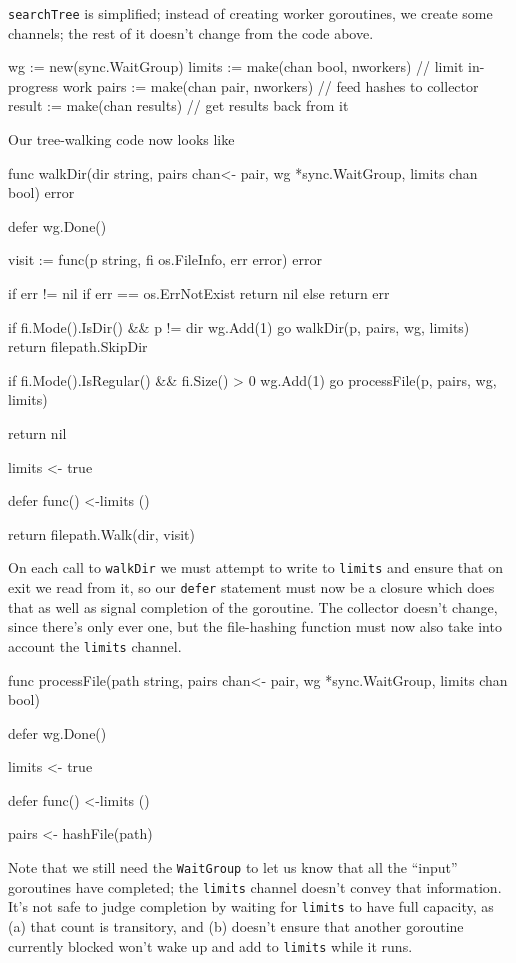 \documentclass[12pt,notitlepage]{article}
\begin{document}
\verb|searchTree| is simplified; instead of creating worker goroutines, we create
some channels; the rest of it doesn't change from the code above.
\begin{golang}
	wg := new(sync.WaitGroup)
	limits := make(chan bool, nworkers) // limit in-progress work
	pairs := make(chan pair, nworkers)  // feed hashes to collector
	result := make(chan results)        // get results back from it
\end{golang}
Our tree-walking code now looks like
\begin{golang}
func walkDir(dir string, pairs chan<- pair, wg *sync.WaitGroup,
             limits chan bool) error {
	defer wg.Done()

	visit := func(p string, fi os.FileInfo, err error) error {
		if err != nil {
			if err == os.ErrNotExist {
				return nil
			} else {
				return err
			}
		}

		if fi.Mode().IsDir() && p != dir {
			wg.Add(1)
			go walkDir(p, pairs, wg, limits)
			return filepath.SkipDir
		}

		if fi.Mode().IsRegular() && fi.Size() > 0 {
			wg.Add(1)
			go processFile(p, pairs, wg, limits)
		}

		return nil
	}

	limits <- true

	defer func() {
		<-limits
	}()

	return filepath.Walk(dir, visit)
}
\end{golang}
On each call to \verb|walkDir| we must attempt to write to \verb|limits| and
ensure that on exit we read from it, so our \verb|defer| statement must now
be a closure which does that as well as signal completion of the goroutine.
The collector doesn't change, since there's only ever one, but the file-hashing
function must now also take into account the \verb|limits| channel.
\begin{golang}
func processFile(path string, pairs chan<- pair, wg *sync.WaitGroup,
                 limits chan bool) {
    defer wg.Done()

	limits <- true

	defer func() {
		<-limits		
	}()

	pairs <- hashFile(path)
}
\end{golang}
Note that we still need the \verb|WaitGroup| to let us know that all the ``input''
goroutines have completed; the \verb|limits| channel doesn't convey that information.
It's not safe to judge completion by waiting for \verb|limits| to have full
capacity, as (a) that count is transitory, and (b) doesn't ensure that another
goroutine currently blocked won't wake up and add to \verb|limits| while it runs.
\end{document}
